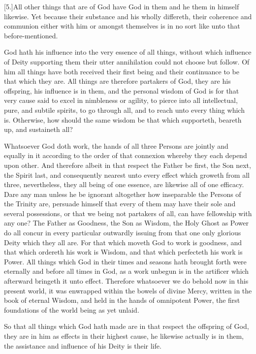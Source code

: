 [5.]All other things that are of God have God in them and he them in himself likewise. Yet because their substance and his wholly differeth, their coherence and communion either with him or amongst themselves is in no sort like unto that before-mentioned.

God hath his influence into the very essence of all things, without which influence of Deity supporting them their utter annihilation could not choose but follow. Of him all things have both received their first being and their continuance to be that which they are. All things are therefore partakers of God, they are his offspring, his influence is in them, and the personal wisdom of God is for that very cause said to excel in nimbleness or agility, to pierce into all intellectual, pure, and subtile spirits, to go through all, and to reach unto every thing which is. Otherwise, how should the same wisdom be that which supporteth, beareth up, and sustaineth all?

Whatsoever God doth work, the hands of all three Persons are jointly and equally in it according to the order of that connexion whereby they each depend upon other. And therefore albeit in that respect the Father be first, the Son next, the Spirit last, and consequently nearest unto every effect  which groweth from all three, nevertheless, they all being of one essence, are likewise all of one efficacy.
 Dare any man unless he be ignorant altogether how inseparable the Persons of the Trinity are, persuade himself that every of them may have their sole and several possessions, or that we being not partakers of all, can have fellowship with any one? The Father as Goodness, the Son as Wisdom, the Holy Ghost as Power do all concur in every particular outwardly issuing from that one only glorious Deity which they all are. For that which moveth God to work is goodness, and that which ordereth his work is Wisdom, and that which perfecteth his work is Power. All things which God in their times and seasons hath brought forth were eternally and before all times in God, as a work unbegun is in the artificer which afterward bringeth it unto effect. Therefore whatsoever we do behold now in this present world, it was enwrapped within the bowels of divine Mercy, written in the book of eternal Wisdom, and held in the hands of omnipotent Power, the first foundations of the world being as yet unlaid.

So that all things which God hath made are in that respect the offspring of God, they are in him as effects in their highest cause, he likewise actually is in them, the assistance and influence of his Deity is their life.

